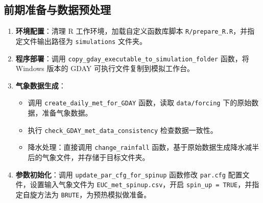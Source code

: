\documentclass[10pt]{config}
\begin{document}
\subsection{前期准备与数据预处理}
\begin{enumerate}
    \item \textbf{环境配置}：清理 R 工作环境，加载自定义函数库脚本 \texttt{R/prepare\_R.R}，并指定文件输出路径为 \texttt{simulations} 文件夹。
    \item \textbf{程序部署}：调用 \texttt{copy\_gday\_executable\_to\_simulation\_folder} 函数，将 Windows 版本的 GDAY 可执行文件复制到模拟工作台。
    \item \textbf{气象数据生成}：
    \begin{itemize}
        \item 调用 \texttt{create\_daily\_met\_for\_GDAY} 函数，读取 \texttt{data/forcing} 下的原始数据，准备气象数据。
        \item 执行 \texttt{check\_GDAY\_met\_data\_consistency} 检查数据一致性。
        \item 降水处理：直接调用 \texttt{change\_rainfall} 函数，基于原始数据生成降水减半后的气象文件，并存储于目标文件夹。
    \end{itemize}
    \item \textbf{参数初始化}：调用 \texttt{update\_par\_cfg\_for\_spinup} 函数修改 \texttt{par.cfg} 配置文件，设置输入气象文件为 \texttt{EUC\_met\_spinup.csv}，开启 \texttt{spin\_up = TRUE}，并指定自旋方法为 \texttt{BRUTE}，为预热模拟做准备。
\end{enumerate}
\end{document}
